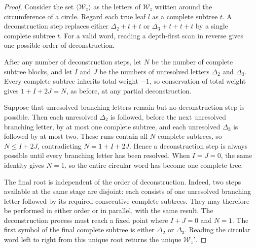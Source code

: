 \documentclass[11pt,fleqn]{article}
\theoremstyle{plain}
\begin{document}
	
	\begin{proof}	
		Consider the set $\langle \mathcal{W}_z \rangle$ as the letters 
		of $\mathcal{W}_z$ written around the circumference of a circle. Regard 
		each true leaf $l$ as a complete subtree $t$. A deconstruction step replaces
		either $\Delta_2+t+t$ or $\Delta_3+t+t+t$ by a single complete subtree $t$. 
		For a valid word, reading a depth-first scan in reverse gives one possible 
		order of deconstruction. 
		
		After any number of deconstruction steps, let $N$ be the 
		number of complete subtree blocks, and let $I$ and $J$ be the numbers 
		of unresolved letters $\Delta_2$ and $\Delta_3$. Every complete subtree 
		inherits total weight $-1$, so conservation of total weight gives 
		$1+I+2J=N$, as before, at any partial deconstruction.
		
		Suppose that unresolved branching letters remain but no deconstruction
		step is possible. Then each unresolved $\Delta_2$ is followed, before
		the next unresolved branching letter, by at most one complete subtree,
		and each unresolved $\Delta_3$ is followed by at most two. These runs
		contain all $N$ complete subtrees, so $N\leq I+2J$, contradicting
		$N=1+I+2J$. Hence a deconstruction step is always possible until every
		branching letter has been resolved. When $I=J=0$, the same identity
		gives $N=1$, so the entire circular word has become one complete tree.
		
		The final root is independent of the order of deconstruction. Indeed,
		two steps available at the same stage are disjoint: each consists of
		one unresolved branching letter followed by its required consecutive
		complete subtrees. They may therefore be performed in either order or
		in parallel, with the same result. The deconstruction 
		process must reach a fixed point where $I+J=0$ and $N=1$. The first 
		symbol of the final complete subtree is either $\Delta_2$ or $\Delta_3$. 
		Reading the circular word left to right from this unique root 
		returns the unique $\mathcal{W}_z'$.
	\end{proof}
	
\end{document}
